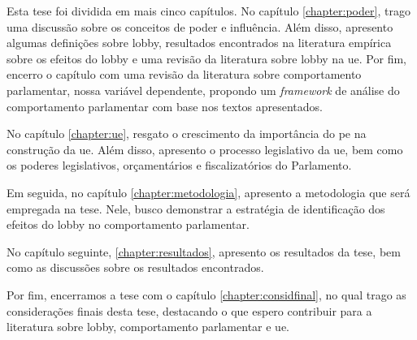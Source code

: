 Esta tese foi dividida em mais cinco capítulos. No capítulo \ref{chapter:poder}, trago uma discussão sobre os conceitos de poder e influência. Além disso, apresento algumas definições sobre lobby, resultados encontrados na literatura empírica sobre os efeitos do lobby e uma revisão da literatura sobre lobby na \acrshort{ue}. Por fim, encerro o capítulo com uma revisão da literatura sobre comportamento parlamentar, nossa variável dependente, propondo um \textit{framework} de análise do comportamento parlamentar com base nos textos apresentados.

No capítulo \ref{chapter:ue}, resgato o crescimento da importância do \acrshort{pe} na construção da \acrshort{ue}. Além disso, apresento o processo legislativo da \acrshort{ue}, bem como os poderes legislativos, orçamentários e fiscalizatórios do Parlamento.

Em seguida, no capítulo \ref{chapter:metodologia}, apresento a metodologia que será empregada na tese. Nele, busco demonstrar a estratégia de identificação dos efeitos do lobby no comportamento parlamentar.

No capítulo seguinte, \ref{chapter:resultados}, apresento os resultados da tese, bem como as discussões sobre os resultados encontrados.

Por fim, encerramos a tese com o capítulo \ref{chapter:considfinal}, no qual trago as considerações finais desta tese, destacando o que espero contribuir para a literatura sobre lobby, comportamento parlamentar e \acrshort{ue}.